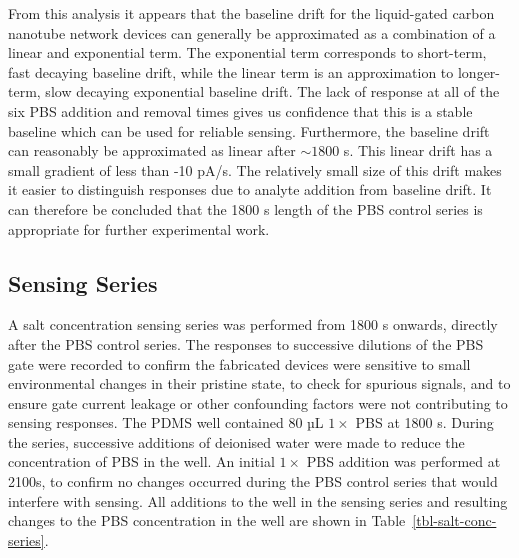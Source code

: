 \documentclass[
  a4paper,
]{scrbook}
\begin{document}
From this analysis it appears that the baseline drift for the
liquid-gated carbon nanotube network devices can generally be
approximated as a combination of a linear and exponential term. The
exponential term corresponds to short-term, fast decaying baseline
drift, while the linear term is an approximation to longer-term, slow
decaying exponential baseline drift. The lack of response at all of the
six PBS addition and removal times gives us confidence that this is a
stable baseline which can be used for reliable sensing. Furthermore, the
baseline drift can reasonably be approximated as linear after
\(\sim 1800\) s. This linear drift has a small gradient of less than -10
pA/s. The relatively small size of this drift makes it easier to
distinguish responses due to analyte addition from baseline drift. It
can therefore be concluded that the 1800 s length of the PBS control
series is appropriate for further experimental work.

\hypertarget{sec-salt-conc-series}{%
\subsection{Sensing Series}\label{sec-salt-conc-series}}

A salt concentration sensing series was performed from 1800 s onwards,
directly after the PBS control series. The responses to successive
dilutions of the PBS gate were recorded to confirm the fabricated
devices were sensitive to small environmental changes in their pristine
state, to check for spurious signals, and to ensure gate current leakage
or other confounding factors were not contributing to sensing responses.
The PDMS well contained 80 µL \(1 \times\) PBS at 1800 s. During the
series, successive additions of deionised water were made to reduce the
concentration of PBS in the well. An initial \(1 \times\) PBS addition
was performed at 2100s, to confirm no changes occurred during the PBS
control series that would interfere with sensing. All additions to the
well in the sensing series and resulting changes to the PBS
concentration in the well are shown in Table~\ref{tbl-salt-conc-series}.
\end{document}
